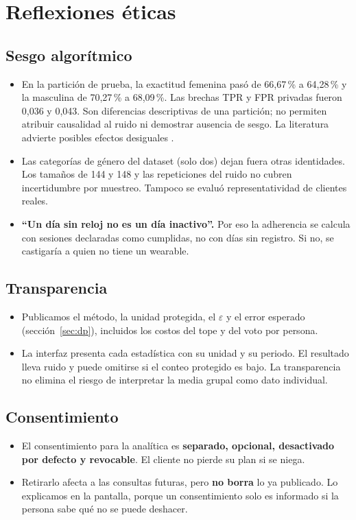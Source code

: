 \documentclass[11pt]{article}
\begin{document}
\section{Reflexiones éticas}

\subsection*{Sesgo algorítmico}
\begin{itemize}[nosep]
  \item En la partición de prueba, la exactitud femenina pasó de 66,67\,\% a 64,28\,\% y la masculina de 70,27\,\% a 68,09\,\%. Las brechas TPR y FPR privadas fueron 0,036 y 0,043. Son diferencias descriptivas de una partición; no permiten atribuir causalidad al ruido ni demostrar ausencia de sesgo. La literatura advierte posibles efectos desiguales \cite{bagdasaryan2019}.
  \item Las categorías de género del dataset (solo dos) dejan fuera otras identidades. Los tamaños de 144 y 148 y las repeticiones del ruido no cubren incertidumbre por muestreo. Tampoco se evaluó representatividad de clientes reales.
  \item \textbf{``Un día sin reloj no es un día inactivo''.} Por eso la adherencia se calcula con sesiones declaradas como cumplidas, no con días sin registro. Si no, se castigaría a quien no tiene un wearable.
\end{itemize}

\subsection*{Transparencia}
\begin{itemize}[nosep]
  \item Publicamos el método, la unidad protegida, el $\varepsilon$ y el error esperado (sección~\ref{sec:dp}), incluidos los costos del tope y del voto por persona.
  \item La interfaz presenta cada estadística con su unidad y su periodo. El resultado lleva ruido y puede omitirse si el conteo protegido es bajo. La transparencia no elimina el riesgo de interpretar la media grupal como dato individual.
\end{itemize}

\subsection*{Consentimiento}
\begin{itemize}[nosep]
  \item El consentimiento para la analítica es \textbf{separado, opcional, desactivado por defecto y revocable}. El cliente no pierde su plan si se niega.
  \item Retirarlo afecta a las consultas futuras, pero \textbf{no borra} lo ya publicado. Lo explicamos en la pantalla, porque un consentimiento solo es informado si la persona sabe qué no se puede deshacer.
\end{itemize}
\end{document}
